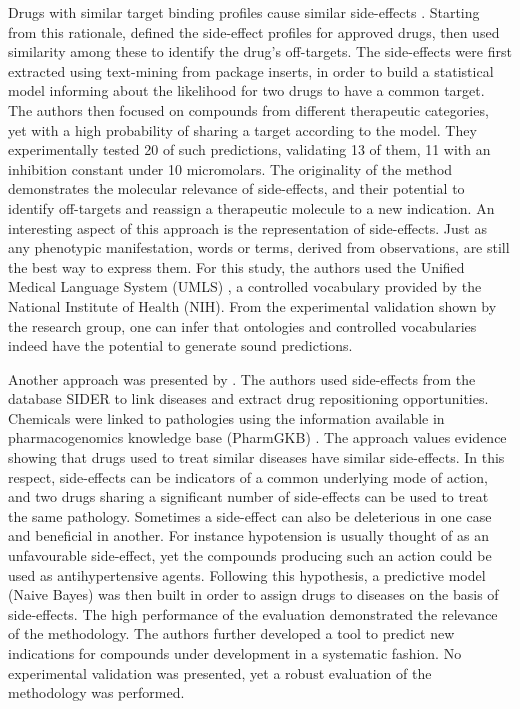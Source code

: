 Drugs with similar target binding profiles cause similar side-effects \citep{fliri2005analysis} \citep{fliri2007analysis}. Starting from this rationale, \cite{campillos2008drug} defined the side-effect profiles for approved drugs, then used similarity among these to identify the drug's off-targets. The side-effects were first extracted using text-mining from package inserts, in order to build a statistical model informing about the likelihood for two drugs to have a common target. The authors then focused on compounds from different therapeutic categories, yet with a high probability of sharing a target according to the model. They experimentally tested 20 of such predictions, validating 13 of them, 11 with an inhibition constant under 10 micromolars. The originality of the method demonstrates the molecular relevance of side-effects, and their potential to identify off-targets and reassign a therapeutic molecule to a new indication. An interesting aspect of this approach is the representation of side-effects. Just as any phenotypic manifestation, words or terms, derived from observations, are still the best way to express them. For this study, the authors used the Unified Medical Language System (UMLS) \citep{bodenreider2004unified}, a controlled vocabulary provided by the National Institute of Health (NIH). From the experimental validation shown by the research group, one can infer that ontologies and controlled vocabularies indeed have the potential to generate sound predictions.

Another approach was presented by \cite{yang2011systematic}. The authors used side-effects from the database SIDER \citep{kuhn2010side} to link diseases and extract drug repositioning opportunities. Chemicals were linked to pathologies using the information available in pharmacogenomics knowledge base (PharmGKB) \citep{whirl2012pharmacogenomics}. The approach values evidence showing that drugs used to treat similar diseases have similar side-effects. In this respect, side-effects can be indicators of a common underlying mode of action, and two drugs sharing a significant number of side-effects can be used to treat the same pathology. Sometimes a side-effect can also be deleterious in one case and beneficial in another. For instance hypotension is usually thought of as an unfavourable side-effect, yet the compounds producing such an action could be used as antihypertensive agents. Following this hypothesis, a predictive model (Naive Bayes) was then built in order to assign drugs to diseases on the basis of side-effects. The high performance of the evaluation demonstrated the relevance of the methodology. The authors further developed a tool to predict new indications for compounds under development in a systematic fashion. No experimental validation was presented, yet a robust evaluation of the methodology was performed.

